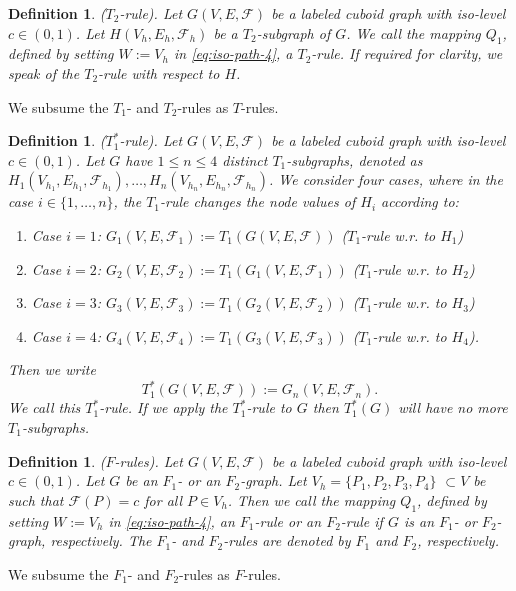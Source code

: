 \documentclass[a4paper,11pt]{article}
\newtheorem{definition}[theorem]{Definition}
\begin{document}
\begin{definition}($T_2$-rule). Let $G(V,E,\mathcal{F})$ be a labeled cuboid graph with iso-level
$c\in (0,1)$. Let $H(V_h,E_h,\mathcal{F}_h)$ be a $T_2$-subgraph of $G$. We call the mapping
$Q_1$, defined by setting $W:=V_h$ in \eqref{eq:iso-path-4}, a $T_2$-rule. If required for clarity,
we speak of the $T_2$-rule with respect to $H$.
\label{def:iso-path-7}
\end{definition}
\noindent We subsume the $T_1$- and $T_2$-rules as $T$-rules.

\begin{definition}($T_1^*$-rule). Let $G(V,E,\mathcal{F})$ be a labeled cuboid graph with iso-level
$c\in (0,1)$. Let $G$ have $1\leq n\leq 4$ distinct $T_1$-subgraphs, denoted as $H_1(V_{h_1},E_{h_1},
\mathcal{F}_{h_1}),\ldots,H_n(V_{h_n},E_{h_n},\mathcal{F}_{h_n})$.  We consider four cases, where
in the case $i\in\{1,\ldots,n\}$, the $T_1$-rule changes the node values of $H_i$ according to:
\begin{enumerate}
\item Case $i=1$: $G_1(V,E,\mathcal{F}_1):=T_1(G(V,E,\mathcal{F}))$ ($T_1$-rule w.r. to $H_1$)
\item Case $i=2$: $G_2(V,E,\mathcal{F}_2):=T_1(G_1(V,E,\mathcal{F}_1))$ ($T_1$-rule w.r. to $H_2$)
\item Case $i=3$: $G_3(V,E,\mathcal{F}_3):=T_1(G_2(V,E,\mathcal{F}_2))$ ($T_1$-rule w.r. to $H_3$)
\item Case $i=4$: $G_4(V,E,\mathcal{F}_4):=T_1(G_3(V,E,\mathcal{F}_3))$ ($T_1$-rule w.r. to $H_4$).
\end{enumerate}
Then we write
\begin{equation}
T^*_1(G(V,E,\mathcal{F})):=G_n(V,E,\mathcal{F}_n).
\label{eq:iso-path-star-map}
\end{equation}
We call this $T_1^*$-rule. If we apply the $T_1^*$-rule to $G$ then $T_1^*(G)$
will have no more $T_1$-subgraphs.
\label{def:iso-path-star-map}
\end{definition}

\begin{definition}($F$-rules). Let $G(V,E,\mathcal{F})$ be a labeled cuboid graph with iso-level
$c\in (0,1)$. Let $G$ be an $F_1$- or an $F_2$-graph. Let $V_h=\{P_1,P_2,P_3,P_4\}$
$\subset V$ be such that $\mathcal{F}(P)=c$ for all $P\in V_h$. Then we call the mapping $Q_1$,
defined by setting $W:=V_h$ in \eqref{eq:iso-path-4}, an $F_1$-rule or an $F_2$-rule if $G$ is an
$F_1$- or $F_2$-graph, respectively. The $F_1$- and $F_2$-rules are denoted by $F_1$ and $F_2$,
respectively.
\label{def:iso-path-8}
\end{definition}
\noindent We subsume the $F_1$- and $F_2$-rules as $F$-rules.
\end{document}
